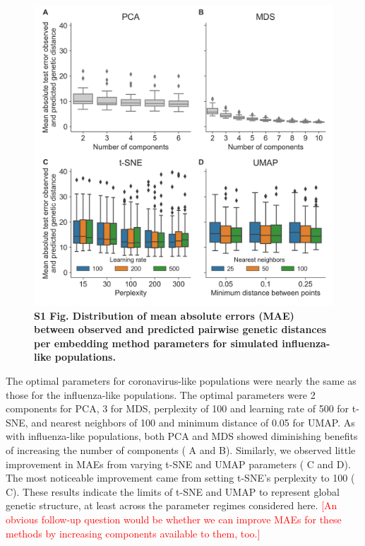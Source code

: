 \documentclass[10pt,letterpaper]{article}
\def\jhc#1{\textcolor{red}{[#1]}}
\begin{document}
\begin{figure}[!h]
  \includegraphics[width=\columnwidth]{figures/simulated-influenza-like-with-no-reassortment-scores-by-parameters.png}
  \caption*{{\bf S1 Fig. Distribution of mean absolute errors (MAE) between observed and predicted pairwise genetic distances per embedding method parameters for simulated influenza-like populations.}}
\end{figure}

The optimal parameters for coronavirus-like populations were nearly the same as those for the influenza-like populations.
The optimal parameters were 2 components for PCA, 3 for MDS, perplexity of 100 and learning rate of 500 for t-SNE, and nearest neighbors of 100 and minimum distance of 0.05 for UMAP.
As with influenza-like populations, both PCA and MDS showed diminishing benefits of increasing the number of components ( A and B).
Similarly, we observed little improvement in MAEs from varying t-SNE and UMAP parameters ( C and D).
The most noticeable improvement came from setting t-SNE's perplexity to 100 ( C).
These results indicate the limits of t-SNE and UMAP to represent global genetic structure, at least across the parameter regimes considered here.
\jhc{An obvious follow-up question would be whether we can improve MAEs for these methods by increasing components available to them, too.}
\end{document}
